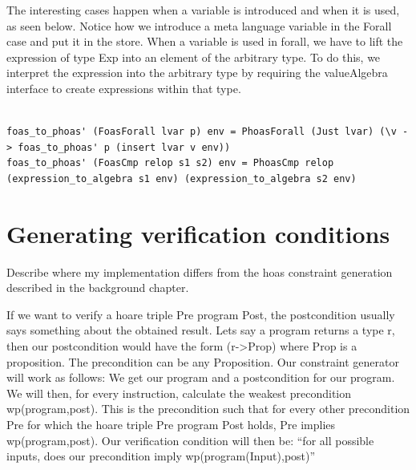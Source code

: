 The interesting cases happen when a variable is introduced and when it is used, as seen below. Notice how we introduce a meta language variable in the Forall case and put it in the store. When a variable is used in forall, we have to lift the expression of type Exp into an element of the arbitrary type. To do this, we interpret the expression into the arbitrary type by requiring the valueAlgebra interface to create expressions within that type.


\begin{verbatim}
    
foas_to_phoas' (FoasForall lvar p) env = PhoasForall (Just lvar) (\v -> foas_to_phoas' p (insert lvar v env))
foas_to_phoas' (FoasCmp relop s1 s2) env = PhoasCmp relop (expression_to_algebra s1 env) (expression_to_algebra s2 env)
\end{verbatim}











\section{Generating verification conditions}






Describe where my implementation differs from the hoas constraint generation described in the background chapter.

If we want to verify a hoare triple {Pre} program {Post}, the postcondition usually says something about the obtained result. Lets say a program returns a type r, then our postcondition would have the form (r->Prop) where Prop is a proposition. The precondition can be any Proposition. Our constraint generator will work as follows: We get our program and a postcondition for our program. We will then, for every instruction, calculate the weakest precondition wp(program,post). This is the precondition such that for every other precondition Pre for which the hoare triple {Pre} program {Post} holds, Pre implies wp(program,post). Our verification condition will then be: “for all possible inputs, does our precondition imply wp(program(Input),post)”


\subsection{}

